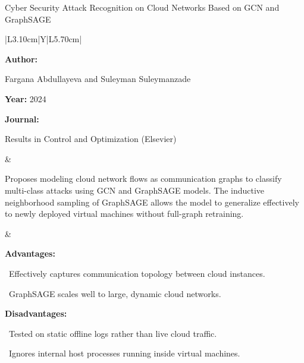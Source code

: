 \begin{frame}[t]{Cyber Security Attack Recognition on Cloud Networks Based on GCN and GraphSAGE}
\vspace{-0.30em}
{\footnotesize\setlength{\tabcolsep}{3.5pt}\renewcommand{\arraystretch}{1.10}
\begin{tabularx}{\textwidth}{|L{3.10cm}|Y|L{5.70cm}|}
\hline\lrhdr\hline
\begin{minipage}[t]{\linewidth}\fontsize{7.2pt}{9.2pt}\raggedright\selectfont
\textbf{Author:}\par
Fargana Abdullayeva and Suleyman Suleymanzade\par\vspace{4pt}
\textbf{Year:} 2024\par\vspace{4pt}
\textbf{Journal:}\par
Results in Control and Optimization (Elsevier)\par\vspace{4pt}
\end{minipage}
&
\begin{minipage}[t]{\linewidth}\fontsize{7.2pt}{9.2pt}\raggedright\selectfont
Proposes modeling cloud network flows as communication graphs to classify multi-class attacks using GCN and GraphSAGE models. The inductive neighborhood sampling of GraphSAGE allows the model to generalize effectively to newly deployed virtual machines without full-graph retraining.\par\vspace{4pt}
\end{minipage}
&
\begin{minipage}[t]{\linewidth}\fontsize{7.2pt}{9.0pt}\raggedright\selectfont
\textcolor{strengthGreen}{\textbf{Advantages:}}\par\vspace{1.5pt}
\textbullet~Effectively captures communication topology between cloud instances.\par\vspace{2.0pt}\textbullet~GraphSAGE scales well to large, dynamic cloud networks.\par\vspace{4.0pt}
\textcolor{limitRed}{\textbf{Disadvantages:}}\par\vspace{1.5pt}
\textbullet~Tested on static offline logs rather than live cloud traffic.\par\vspace{2.0pt}\textbullet~Ignores internal host processes running inside virtual machines.\par\vspace{4pt}
\end{minipage} \\\hline
\end{tabularx}}
\end{frame}


